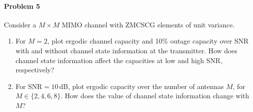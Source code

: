 \documentclass[12pt]{article}
\begin{document}
\paragraph{Problem 5} 
Consider a $M \times M$ MIMO channel with ZMCSCG elements
of unit variance.  

\begin{enumerate}
\item For $M=2$, plot ergodic channel capacity and 10\% outage capacity over $\mathrm{SNR}$ with and without channel state information at the transmitter. How does channel state information affect the capacities at low and high SNR, respectively?

\item For $\mathrm{SNR}=10$\,dB, plot ergodic capacity over the number of antennas $M$, for $M \in \{2,4,6,8\}$. How does the value of channel state information change with $M$?
\end{enumerate}
\end{document}
